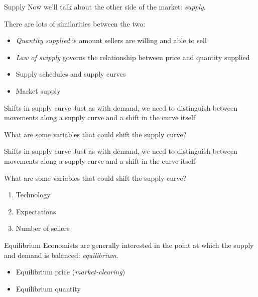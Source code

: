 \documentclass[aspectratio=169]{beamer}
\begin{document}
  \begin{frame}{Supply}
    Now we'll talk about the other side of the market: \textit{supply}.

    \medskip

    There are lots of similarities between the two:
    \begin{itemize}
        \item \textit{Quantity supplied} is amount sellers are willing and able to sell
        \item \textit{Law of suipply} governs the relationship between price and quantity supplied
        \item Supply schedules and supply curves
        \item Market supply
    \end{itemize}
\end{frame}

\begin{frame}{Shifts in supply curve}
   Just as with demand, we need to distinguish between movements along a supply curve and a shift in the curve itself

   \medskip

   What are some variables that could shift the supply curve?
\end{frame}

\begin{frame}{Shifts in supply curve}
    Just as with demand, we need to distinguish between movements along a supply curve and a shift in the curve itself

   \medskip
   
   What are some variables that could shift the supply curve?
    
    \begin{enumerate}
        \item Technology
        \item Expectations
        \item Number of sellers
    \end{enumerate}
 \end{frame}

 \begin{frame}{Equilibrium}
    Economists are generally interested in the point at which the supply and demand is balanced: \textit{equilibrium}.
    \begin{itemize}
        \item Equilibrium price (\textit{market-clearing})
        \item Equilibrium quantity
    \end{itemize}
\end{frame}
\end{document}

